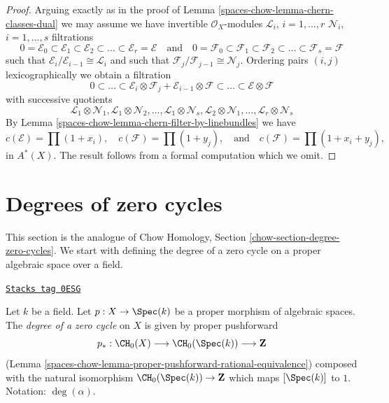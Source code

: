 \begin{proof}
Arguing exactly as in the proof of Lemma \ref{spaces-chow-lemma-chern-classes-dual}
we may assume we have
invertible $\mathcal{O}_X$-modules
${\mathcal L}_i$, $i = 1, \ldots, r$
${\mathcal N}_i$, $i = 1, \ldots, s$
filtrations
$$
0 = \mathcal{E}_0 \subset \mathcal{E}_1 \subset \mathcal{E}_2
\subset \ldots \subset \mathcal{E}_r = \mathcal{E}
\quad\text{and}\quad
0 = \mathcal{F}_0 \subset \mathcal{F}_1 \subset \mathcal{F}_2
\subset \ldots \subset \mathcal{F}_s = \mathcal{F}
$$
such that $\mathcal{E}_i/\mathcal{E}_{i - 1} \cong \mathcal{L}_i$
and such that $\mathcal{F}_j/\mathcal{F}_{j - 1} \cong \mathcal{N}_j$.
Ordering pairs $(i, j)$ lexicographically
we obtain a filtration
$$
0 \subset \ldots \subset
\mathcal{E}_i \otimes \mathcal{F}_j
+
\mathcal{E}_{i - 1} \otimes \mathcal{F}
\subset \ldots \subset \mathcal{E} \otimes \mathcal{F}
$$
with successive quotients
$$
\mathcal{L}_1 \otimes \mathcal{N}_1,
\mathcal{L}_1 \otimes \mathcal{N}_2,
\ldots,
\mathcal{L}_1 \otimes \mathcal{N}_s,
\mathcal{L}_2 \otimes \mathcal{N}_1,
\ldots,
\mathcal{L}_r \otimes \mathcal{N}_s
$$
By Lemma \ref{spaces-chow-lemma-chern-filter-by-linebundles}
we have
$$
c(\mathcal{E}) = \prod (1 + x_i),
\quad
c(\mathcal{F}) = \prod (1 + y_j),
\quad\text{and}\quad
c(\mathcal{F}) = \prod (1 + x_i + y_j),
$$
in $A^*(X)$. The result follows from a formal computation
which we omit.
\end{proof}

\section{Degrees of zero cycles}
\label{spaces-chow-section-degree-zero-cycles}
This section is the analogue of Chow Homology, Section
\ref{chow-section-degree-zero-cycles}.
We start with defining the degree of a zero cycle on a proper
algebraic space over a field.

\begin{definition}
\label{spaces-chow-definition-degree-zero-cycle}
\href{https://stacks.math.columbia.edu/tag/0ESG}{\texttt{Stacks tag 0ESG}}

Let $k$ be a field. Let $p : X \to \Spec(k)$ be a proper morphism of
algebraic spaces. The {\it degree of a zero cycle} on $X$ is given by
proper pushforward
$$
p_* : \CH_0(X) \longrightarrow \CH_0(\Spec(k)) \longrightarrow \mathbf{Z}
$$
(Lemma \ref{spaces-chow-lemma-proper-pushforward-rational-equivalence})
composed with the natural isomorphism $\CH_0(\Spec(k)) \to \mathbf{Z}$
which maps $[\Spec(k)]$ to $1$. Notation: $\deg(\alpha)$.
\end{definition}

